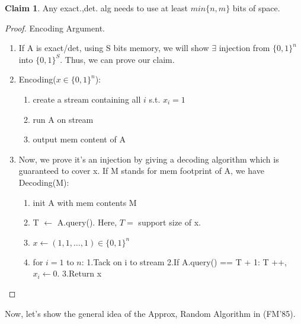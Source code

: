 \documentclass[11pt]{article}
\newcommand{\<}{\langle}
\renewcommand{\>}{\rangle}
\theoremstyle{definition}
\numberwithin{problem}{section}
\newtheorem{claim}[theorem]{Claim}
\begin{document}
           	\begin{claim}
                Any exact.,det. alg needs to use at least $min\{n,m\}$ bits of space.
                \end{claim}
                \begin{proof}
                	Encoding Argument.
                	\begin{enumerate}
                    	\item If A is exact/det, using S bits memory, we will show $\exists$ injection from $\{0, 1\}^n$ into $\{0,1\}^S$. Thus, we can prove our claim.	
                        \item Encoding($x \in \{0,1\}^n$):
                        	\begin{enumerate}
                            	\item create a stream containing all $i$ s.t. $x_i = 1$
                                \item run A on stream
                                \item output mem content of A
                                
                            \end{enumerate}
                        \item Now, we prove it's an injection by giving a decoding algorithm which is guaranteed to cover x. If M stands for mem footprint of A, we have Decoding(M):
                        \begin{enumerate}
                        	\item init A with mem contents M
                            \item T $\leftarrow$ A.query(). Here, $T =$ support size of x. 
                            \item $x \leftarrow (1, 1,\ldots, 1) \in \{0, 1\}^n$
                            \item for $i = 1$ to $n$:
                            	1.Tack on i to stream
                                2.If A.query() == T + 1: T ++, $x_i \leftarrow 0$.
                                3.Return x
                        \end{enumerate}
                    \end{enumerate}	
                \end{proof}
          Now, let's show the general idea of the Approx, Random Algorithm in (FM'85). 
\end{document}
